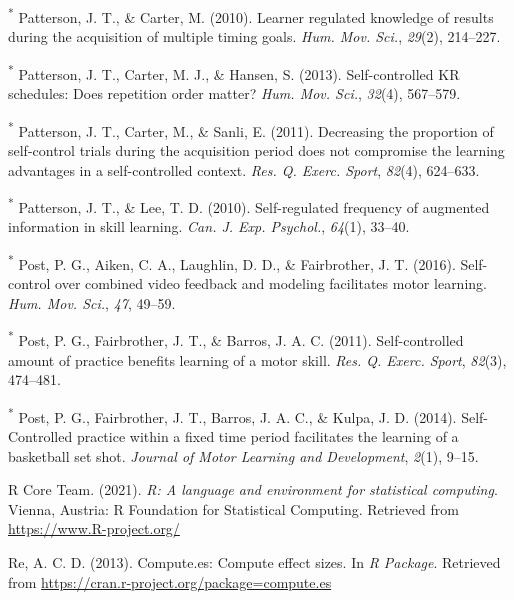 \documentclass[
  english,
  man, donotrepeattitle,floatsintext]{apa7}
\newlength{\cslhangindent}
\newlength{\cslentryspacingunit} %
\newenvironment{CSLReferences}[2] %
 {%
  \setlength{\parindent}{0pt}
  \ifodd #1
  \let\oldpar\par
  \def\par{\hangindent=\cslhangindent\oldpar}
  \fi
  \setlength{\parskip}{#2\cslentryspacingunit}
 }%
 {}
\begin{document}
\begin{CSLReferences}{1}{0}
\leavevmode{}%
\textsuperscript{*} Patterson, J. T., \& Carter, M. (2010). Learner regulated knowledge of results during the acquisition of multiple timing goals. \emph{Hum. Mov. Sci.}, \emph{29}(2), 214--227.

\leavevmode{}%
\textsuperscript{*} Patterson, J. T., Carter, M. J., \& Hansen, S. (2013). Self-controlled {KR} schedules: Does repetition order matter? \emph{Hum. Mov. Sci.}, \emph{32}(4), 567--579.

\leavevmode{}%
\textsuperscript{*} Patterson, J. T., Carter, M., \& Sanli, E. (2011). Decreasing the proportion of self-control trials during the acquisition period does not compromise the learning advantages in a self-controlled context. \emph{Res. Q. Exerc. Sport}, \emph{82}(4), 624--633.

\leavevmode{}%
\textsuperscript{*} Patterson, J. T., \& Lee, T. D. (2010). Self-regulated frequency of augmented information in skill learning. \emph{Can. J. Exp. Psychol.}, \emph{64}(1), 33--40.

\leavevmode{}%
\textsuperscript{*} Post, P. G., Aiken, C. A., Laughlin, D. D., \& Fairbrother, J. T. (2016). Self-control over combined video feedback and modeling facilitates motor learning. \emph{Hum. Mov. Sci.}, \emph{47}, 49--59.

\leavevmode{}%
\textsuperscript{*} Post, P. G., Fairbrother, J. T., \& Barros, J. A. C. (2011). Self-controlled amount of practice benefits learning of a motor skill. \emph{Res. Q. Exerc. Sport}, \emph{82}(3), 474--481.

\leavevmode{}%
\textsuperscript{*} Post, P. G., Fairbrother, J. T., Barros, J. A. C., \& Kulpa, J. D. (2014). {Self-Controlled} practice within a fixed time period facilitates the learning of a basketball set shot. \emph{Journal of Motor Learning and Development}, \emph{2}(1), 9--15.

\leavevmode{}%
R Core Team. (2021). \emph{R: A language and environment for statistical computing}. Vienna, Austria: R Foundation for Statistical Computing. Retrieved from \url{https://www.R-project.org/}

\leavevmode{}%
Re, A. C. D. (2013). Compute.es: Compute effect sizes. In \emph{R Package}. Retrieved from \url{https://cran.r-project.org/package=compute.es}


\end{CSLReferences}
\end{document}
